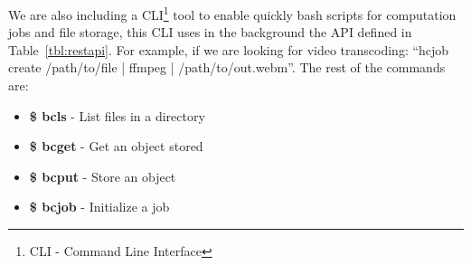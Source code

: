 We are also including a CLI\footnote{CLI - Command Line Interface} tool to enable quickly bash scripts for computation jobs and file storage, this CLI uses in the background the API defined in Table~\ref{tbl:restapi}. For example, if we are looking for video transcoding: ``hcjob create /path/to/file | ffmpeg | /path/to/out.webm''. The rest of the commands are:
  
\begin{itemize}
  \item \textbf{\$ bcls}  - List files in a directory
  \item \textbf{\$ bcget} - Get an object stored
  \item \textbf{\$ bcput} - Store an object
  \item \textbf{\$ bcjob} - Initialize a job   
\end{itemize} 

% 
% 